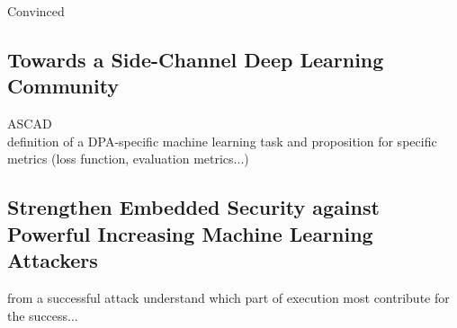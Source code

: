 Convinced 

\subsection{Towards a Side-Channel Deep Learning Community}


ASCAD\\
definition of a DPA-specific machine learning task and proposition for specific metrics (\eg loss function, evaluation metrics...)

\subsection{Strengthen Embedded Security against Powerful Increasing Machine Learning Attackers}
from a successful attack understand which part of execution most contribute for the success...
